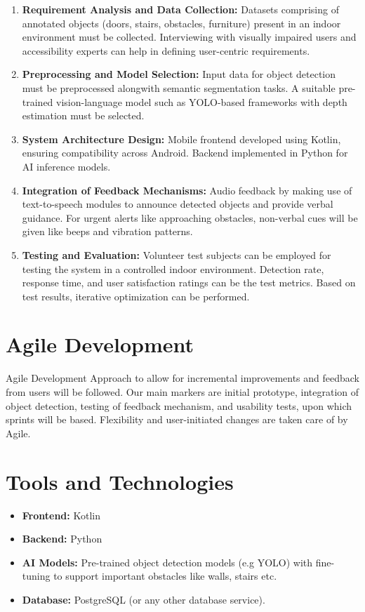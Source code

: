 \documentclass{FastFyp}
\begin{document}
\begin{enumerate}
    \item \textbf{Requirement Analysis and Data Collection:} Datasets comprising of annotated objects (doors, stairs, obstacles, furniture) present in an indoor environment must be collected. Interviewing with visually impaired users and accessibility experts can help in defining user-centric requirements.  

    \item \textbf{Preprocessing and Model Selection:} Input data for object detection must be preprocessed alongwith semantic segmentation tasks. A suitable pre-trained vision-language model such as YOLO-based frameworks with depth estimation must be selected.  

    \item \textbf{System Architecture Design:} Mobile frontend developed using Kotlin, ensuring compatibility across Android. Backend implemented in Python for AI inference models.

    \item \textbf{Integration of Feedback Mechanisms:} Audio feedback by making use of text-to-speech modules to announce detected objects and provide verbal guidance. For urgent alerts like approaching obstacles, non-verbal cues will be given like beeps and vibration patterns.

    \item \textbf{Testing and Evaluation:} Volunteer test subjects can be employed for testing the system in a controlled indoor environment. Detection rate, response time, and user satisfaction ratings can be the test metrics. Based on test results, iterative optimization can be performed.
\end{enumerate}

\section{Agile Development}
Agile Development Approach to allow for incremental improvements and feedback from users will be followed. Our main markers are initial prototype, integration of object detection, testing of feedback mechanism, and usability tests, upon which sprints will be based. Flexibility and user-initiated changes are taken care of by Agile.

\section{Tools and Technologies}
\begin{itemize}
    \item \textbf{Frontend:} Kotlin  
    \item \textbf{Backend:} Python  
    \item \textbf{AI Models:} Pre-trained object detection models (e.g YOLO) with fine-tuning to support important obstacles like walls, stairs etc.  
    \item \textbf{Database:} PostgreSQL (or any other database service).
\end{itemize}
\end{document}
